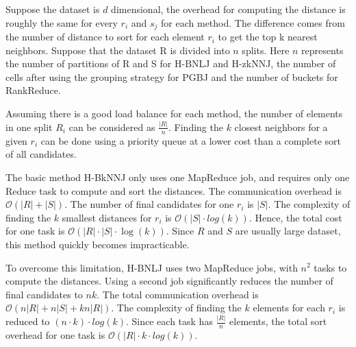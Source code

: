 Suppose the dataset is $d$ dimensional, the overhead for computing the distance is roughly the same for every $r_i$ and $s_j$ for each method. The difference comes from the number of distance to sort for each element $r_i$ to get the top k nearest neighbors. Suppose that the dataset R is divided into $n$ splits. Here $n$ represents the number of partitions of R and S for H-BNLJ and H-zkNNJ, the number of cells after using the grouping strategy for PGBJ and the number of buckets for RankReduce. %

Assuming there is a good load balance for each method, the number of elements in one split $R_i$ can be 
considered as $\frac{\left|R\right|}{n}$. Finding the $k$ closest neighbors for a given $r_i$ can be done using 
a priority queue at a lower cost than a complete sort of all candidates. 


The basic method H-BkNNJ only uses one MapReduce job, and requires  
only one Reduce task to compute and sort the distances. The communication overhead is $\mathcal{O} 
(\left|R\right|+\left|S\right|)$. The number of final candidates for one $r_i$ is $|S|$. The complexity of finding the 
$k$ smallest distances for $r_i$ is $\mathcal{O}(
\left|S\right| \cdot log\left(k\right))$. Hence, the total cost for one task is $\mathcal{O}(\left|R\right| 
\cdot \left|S\right| \cdot \log\left(k\right))$. Since $R$ and $S$ are usually large 
dataset, this method quickly becomes impracticable.

To overcome this limitation, H-BNLJ  \cite{Zhang:2012:EPK:2247596.2247602} uses two MapReduce jobs, with $n^2$  tasks 
to compute the distances. Using a second  job significantly reduces the number of final candidates to $nk$. 
The total communication overhead is $\mathcal{O}(n\left|R\right|+n\left|S\right|+kn\left|R\right|)$. The 
complexity of finding the $k$ elements for each $r_i$ is reduced to $\left(n \cdot k
\right) \cdot log\left(k\right)$. Since each task has $\frac{\left|R\right|}{n}$ elements, the total sort overhead for 
one task is $\mathcal{O}(\left|R\right| \cdot k \cdot log(k))$.

